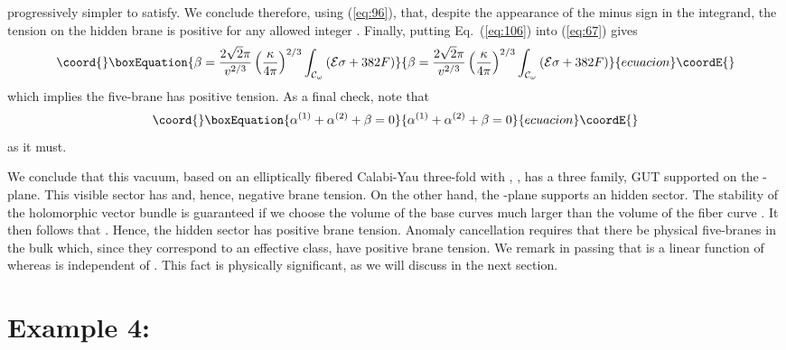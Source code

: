 \documentclass[a4paper,12pt]{article}
\numberwithin{equation}{section}
\theoremstyle{plain}
\begin{document}
progressively simpler to satisfy. We conclude therefore, using (\ref{eq:96}), that, 
despite the appearance of the minus sign in the integrand, the tension on the
hidden brane is positive for any allowed integer \coordHE{}. Finally, putting
Eq.~(\ref{eq:106}) into (\ref{eq:67}) gives
%
\begin{equation}\coord{}\boxEquation{
\beta=\frac{2\sqrt{2}\pi}{v^{2/3}}\left(\frac{\kappa}{4\pi}\right)^{2/3}\int_
{{\cal{C}}_{\omega}}{({\cal{E}}\sigma+382F)}
\label{eq:110}
}{
\beta=\frac{2\sqrt{2}\pi}{v^{2/3}}\left(\frac{\kappa}{4\pi}\right)^{2/3}\int_
{{\cal{C}}_{\omega}}{({\cal{E}}\sigma+382F)}
}{ecuacion}\coordE{}\end{equation}
%
which implies the five-brane has positive tension. As a final check, note that 
%
\begin{equation}\coord{}\boxEquation{
\alpha^{(1)}+\alpha^{(2)}+\beta=0
\label{eq:111}
}{
\alpha^{(1)}+\alpha^{(2)}+\beta=0
}{ecuacion}\coordE{}\end{equation}
%
as it must.

We conclude that this vacuum, based on an elliptically fibered Calabi-Yau
three-fold with \coordHE{}, \coordHE{}, has a three family, \coordHE{} GUT supported
on the \coordHE{}-plane. This visible sector has \coordHE{} and, hence,
negative brane tension. On the other hand, the \coordHE{}-plane supports an \coordHE{}
hidden sector. The stability of the holomorphic vector bundle
\coordHE{} is guaranteed if we choose the volume of the base curves much larger 
than the volume of the fiber curve \coordHE{}. It then follows that \coordHE{}.
Hence, the hidden sector has positive brane tension. Anomaly cancellation 
requires that
there be physical five-branes in the bulk which, since they correspond to an
effective class, have positive brane tension. We remark in passing that
\coordHE{} is a linear function of \coordHE{} whereas \myHighlight{$\beta$}\coordHE{} is independent of
\coordHE{}. This fact is physically significant, as we will discuss in the next
section.

\section*{Example 4: \coordHE{}}
\end{document}
